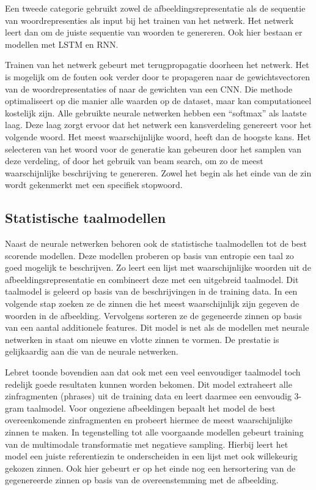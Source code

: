 Een tweede categorie gebruikt zowel de afbeeldingsrepresentatie als de sequentie van 
woordrepresenties als input bij het trainen van het netwerk. Het netwerk leert dan om de juiste sequentie van woorden te genereren. Ook hier bestaan er modellen met LSTM \cite{Donahue2015,Google} en RNN\cite{Karpathy2015}. 

Trainen van het netwerk gebeurt met terugpropagatie doorheen het netwerk. Het is mogelijk om de fouten ook verder door te propageren naar de gewichtsvectoren van de woordrepresentaties of naar de gewichten van een CNN. Die methode optimaliseert op die manier alle waarden op de  dataset, maar kan computationeel kostelijk zijn.
Alle gebruikte neurale netwerken hebben een ``softmax'' als laatste laag. Deze laag zorgt ervoor dat het netwerk een kansverdeling genereert voor het volgende woord. Het meest waarschijnlijke woord, heeft dan de hoogste kans.
Het selecteren van het woord voor de generatie kan gebeuren door het samplen van deze verdeling, of door het gebruik van beam search, om zo de meest waarschijnlijke beschrijving te genereren.  Zowel het begin als het einde van de zin wordt gekenmerkt met een specifiek stopwoord.

\subsection{Statistische taalmodellen}
Naast de neurale netwerken behoren ook de statistische taalmodellen tot de best scorende modellen.
Deze modellen proberen op basis van entropie een taal zo goed mogelijk te beschrijven. Zo leert \cite{Mitchell2015} een lijst met waarschijnlijke woorden uit de afbeeldingsrepresentatie en combineert deze met een uitgebreid taalmodel. Dit taalmodel is geleerd op basis van de beschrijvingen in de training data. In een volgende stap zoeken ze de zinnen die het meest waarschijnlijk zijn gegeven de woorden in de afbeelding. Vervolgens sorteren ze de gegeneerde zinnen op basis van een aantal additionele features. Dit model is net als de modellen met neurale netwerken in staat om nieuwe en vlotte zinnen te vormen. De prestatie is gelijkaardig aan die van de neurale netwerken.

Lebret \cite{Lebret2015} toonde bovendien aan dat ook met een veel eenvoudiger taalmodel toch redelijk goede resultaten kunnen worden bekomen. Dit model extraheert alle zinfragmenten (phrases) uit de training data en leert daarmee een eenvoudig 3-gram taalmodel. Voor ongeziene afbeeldingen bepaalt het model de best overeenkomende zinfragmenten en probeert hiermee de meest waarschijnlijke zinnen te maken. In tegenstelling tot alle voorgaande modellen gebeurt training van de multimodale transformatie met negatieve sampling. Hierbij leert het model een juiste referentiezin te onderscheiden in een lijst met ook willekeurig gekozen zinnen. Ook hier gebeurt er op het einde nog een hersortering van de gegenereerde zinnen op basis van de overeenstemming met de afbeelding.

